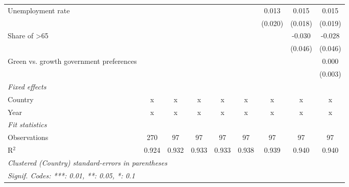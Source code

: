 \begin{table}[htbp]
\begin{tabular}{lcccccccc}
      Unemployment rate                                      &         &         &         &         &         & 0.013   & 0.015   & 0.015\\   
                                                             &         &         &         &         &         & (0.020) & (0.018) & (0.019)\\   
      Share of >65                                           &         &         &         &         &         &         & -0.030  & -0.028\\   
                                                             &         &         &         &         &         &         & (0.046) & (0.046)\\   
      Green vs. growth government preferences                &         &         &         &         &         &         &         & 0.000\\   
                                                             &         &         &         &         &         &         &         & (0.003)\\   
      \emph{Fixed effects}\\
      Country                                                & x       & x       & x       & x       & x       & x       & x       & x\\  
      Year                                                   & x       & x       & x       & x       & x       & x       & x       & x\\  
      \midrule \emph{Fit statistics}\\
      Observations                                           & 270     & 97      & 97      & 97      & 97      & 97      & 97      & 97\\  
      R$^2$                                                  & 0.924   & 0.932   & 0.933   & 0.933   & 0.938   & 0.939   & 0.940   & 0.940\\  
      \midrule
      \multicolumn{9}{l}{\emph{Clustered (Country) standard-errors in parentheses}}\\
      \multicolumn{9}{l}{\emph{Signif. Codes: ***: 0.01, **: 0.05, *: 0.1}}\\
   \end{tabular}
\end{table}


